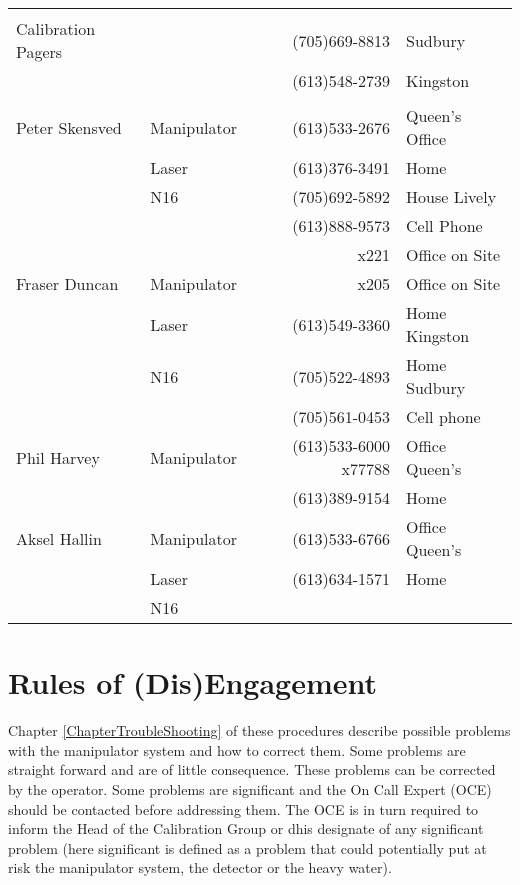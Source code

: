 \begin{center}
\begin{tabular}{|l|l|rl|}
\hline
         &           &             &                             \\
Calibration Pagers   &             &  (705)669-8813 &  Sudbury  \\
         &                         &  (613)548-2739 &  Kingston   \\
         &             &               & \\
\hline
Peter Skensved & Manipulator & (613)533-2676 &  Queen's Office \\
               & Laser       & (613)376-3491 &  Home  \\
               & N16         & (705)692-5892 & House Lively \\
               &             & (613)888-9573 & Cell Phone \\
               &             &          x221 & Office on Site \\
\hline
Fraser Duncan & Manipulator &          x205 & Office on Site \\
              & Laser       & (613)549-3360 & Home Kingston\\
              & N16         & (705)522-4893 & Home Sudbury \\
              &             & (705)561-0453 & Cell phone \\
\hline
Phil Harvey    & Manipulator  & (613)533-6000 \  x77788     & Office Queen's   \\
               &                      & (613)389-9154 &  Home  \\
\hline
Aksel Hallin  & Manipulator & (613)533-6766 & Office Queen's \\
              & Laser       & (613)634-1571 & Home \\
              & N16         &               &  \\
\hline
\end{tabular}
\end{center}   


\newpage
\section{Rules of (Dis)Engagement}

  Chapter \ref{ChapterTroubleShooting} of these procedures describe 
possible problems
with the manipulator system and how to correct them.  Some problems are
straight forward and are of little consequence.  These problems can be
corrected by the  operator.  Some problems are significant and the
On Call Expert (OCE) should be contacted before addressing them.  
The OCE is in turn required to inform the Head of the Calibration Group
or dhis designate 
of any significant problem (here significant is defined as a problem
that could potentially put at risk the manipulator system, the detector
or the heavy water). 
  
